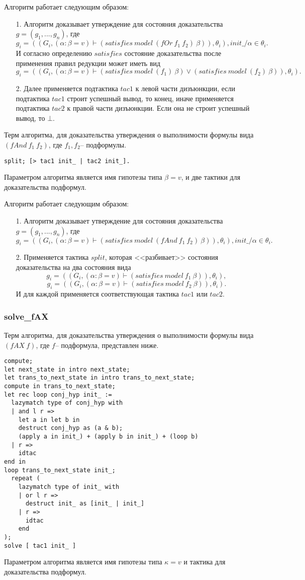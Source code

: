 \documentclass[12pt]{article}
\begin{document}
Алгоритм работает следующим образом:
\begin{enumerate}
    \item[1.] Алгоритм доказывает утверждение для состояния доказательства $g = (g_1, ..., g_n)$, где 
    $$g_i = ((G_i, (\alpha: \beta = v) \vdash (satisfies\ model\ (fOr\ f_1\ f_2)\ \beta)), \theta_i), init\_/\alpha \in \theta_i.$$
    И согласно определению $satisfies$ состояние доказательства после применения правил редукции может иметь вид
$$g_i = ((G_i, (\alpha: \beta = v) \vdash (satisfies\ model\ (f_1)\ \beta) \vee (satisfies\ model\ (f_2)\ \beta)), \theta_i).$$
    \item[2.] Далее применяется подтактика $tac1$ к левой части дизъюнкции, если подтактика $tac1$ строит успешный вывод, то конец, иначе применяется подтактика $tac2$ к правой части дизъюнкции. Если она не строит успешный вывод, то $\bot$.
\end{enumerate}

Терм алгоритма, для доказательства утверждения о выполнимости формулы вида $(fAnd\ f_1\ f_2)$, где $f_1, f_2$-- подформулы.
\begin{verbatim}
split; [> tac1 init_ | tac2 init_].
\end{verbatim}
Параметром алгоритма является имя гипотезы типа $\beta = v$, и две тактики для доказательства подформул.

Алгоритм работает следующим образом:
\begin{enumerate}
    \item[1.] Алгоритм доказывает утверждение для состояния доказательства $g = (g_1, ..., g_n)$, где 
    $$g_i = ((G_i, (\alpha: \beta = v)  \vdash (satisfies\ model\ (fAnd\ f_1\ f_2)\ \beta)), \theta_i), init\_/\alpha \in \theta_i.$$
    \item[2.] Применяется тактика $split$, которая <<разбивает>> состояния доказательства на два состояния вида
    $$g_i = ((G_i, (\alpha: \beta = v)  \vdash (satisfies\ model\ f_1\ \beta)), \theta_i),$$
    $$g_i = ((G_i, (\alpha: \beta = v)  \vdash (satisfies\ model\ f_2\ \beta)), \theta_i).$$
    И для каждой применяется соответствующая тактика $tac1$ или $tac2$.
\end{enumerate}

\subsubsection{solve\_fAX}
Терм алгоритма, для доказательства утверждения о выполнимости формулы вида $(fAX\ f)$, где $f$-- подформула, представлен ниже.
\begin{verbatim}
compute;
let next_state in intro next_state;
let trans_to_next_state in intro trans_to_next_state;
compute in trans_to_next_state;
let rec loop conj_hyp init_ :=
  lazymatch type of conj_hyp with
  | and l r => 
    let a in let b in
    destruct conj_hyp as (a & b);
    (apply a in init_) + (apply b in init_) + (loop b)
  | r => 
    idtac
end in
loop trans_to_next_state init_;
  repeat (
    lazymatch type of init_ with
    | or l r =>
      destruct init_ as [init_ | init_]
    | r => 
      idtac
    end
);
solve [ tac1 init_ ]
\end{verbatim}
Параметром алгоритма является имя гипотезы типа $\kappa = v$ и тактика для доказательства подформул.
\end{document}
